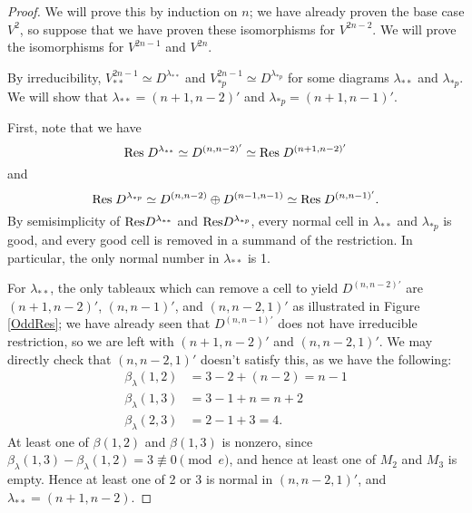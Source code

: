 \documentclass{amsart}
\begin{document}
\begin{proof}
  We will prove this by induction on $n$;
  we have already proven the base case $V^{2}$, so suppose that we have proven these isomorphisms for $V^{2n-2}$.
  We will prove the isomorphisms for $V^{2n-1}$ and $V^{2n}$.

  By irreducibility, $V^{2n-1}_{**} \simeq D^{\lambda_{**}}$ and $V^{2n-1}_{*p} \simeq D^{\lambda_{*p}}$ for some diagrams $\lambda_{**}$ and $\lambda_{*p}$.
  We will show that $\lambda_{**} = (n+1,n-2)'$ and $\lambda_{*p} = (n+1,n-1)'$.
  
  First, note that we have \[\text{Res} \; D^{\lambda_{**}} \simeq D^{(n,n-2)'} \simeq \text{Res} \; D^{(n+1,n-2)'}\] and \[\text{Res} \; D^{\lambda_{*p}} \simeq D^{(n,n-2)} \oplus D^{(n-1,n-1)} \simeq \text{Res} \; D^{(n,n-1)'}.\]
  By semisimplicity of $\text{Res} D^{\lambda_{**}}$ and $\text{Res} D^{\lambda_{*p}}$, every normal cell in $\lambda_{**}$ and $\lambda_{*p}$ is good, and every good cell is removed in a summand of the restriction.
  In particular, the only normal number in $\lambda_{**}$ is 1.

  For $\lambda_{**}$, the only tableaux which can remove a cell to yield $D^{(n,n-2)'}$ are $(n+1,n-2)'$, $(n,n-1)'$, and $(n,n-2,1)'$ as illustrated in Figure \ref{OddRes};
  we have already seen that $D^{(n,n-1)'}$ does not have irreducible restriction, so we are left with $(n+1,n-2)'$ and $(n,n-2,1)'$.
  We may directly check that $(n,n-2,1)'$ doesn't satisfy this, as we have the following:
  \begin{align*}
    \beta_\lambda(1,2) &= 3 - 2 + (n-2) = n-1\\
    \beta_\lambda(1,3) &= 3 - 1 + n = n+2\\
    \beta_\lambda(2,3) &= 2 - 1 + 3 = 4.
   \end{align*}
  At least one of $\beta(1,2)$ and $\beta(1,3)$ is nonzero, since $\beta_\lambda(1,3) - \beta_\lambda(1,2) = 3 \not\equiv 0 \pmod e$, and hence at least one of $M_2$ and $M_3$ is empty.
  Hence at least one of 2 or 3 is normal in $(n,n-2,1)'$, and $\lambda_{**} = (n+1,n-2)$.


\end{proof}
\end{document}
